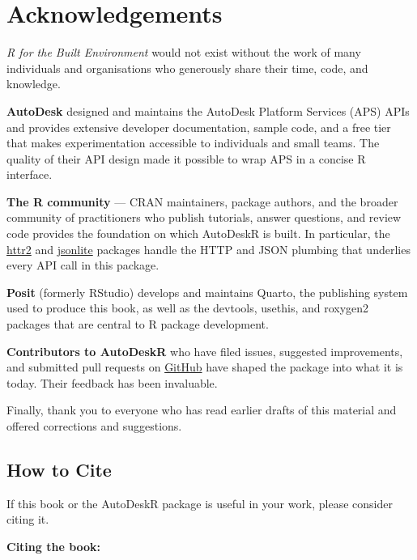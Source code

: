 \documentclass[
  11pt,
  letterpaper,
  DIV=11,
  numbers=noendperiod]{scrreprt}
\begin{document}
\chapter*{Acknowledgements}\label{acknowledgements}


\emph{R for the Built Environment} would not exist without the work of
many individuals and organisations who generously share their time,
code, and knowledge.

\textbf{AutoDesk} designed and maintains the AutoDesk Platform Services
(APS) APIs and provides extensive developer documentation, sample code,
and a free tier that makes experimentation accessible to individuals and
small teams. The quality of their API design made it possible to wrap
APS in a concise R interface.

\textbf{The R community} --- CRAN maintainers, package authors, and the
broader community of practitioners who publish tutorials, answer
questions, and review code provides the foundation on which AutoDeskR is
built. In particular, the \href{https://httr2.r-lib.org}{httr2} and
\href{https://jeroen.r-universe.dev/jsonlite}{jsonlite} packages handle
the HTTP and JSON plumbing that underlies every API call in this
package.

\textbf{Posit} (formerly RStudio) develops and maintains Quarto, the
publishing system used to produce this book, as well as the devtools,
usethis, and roxygen2 packages that are central to R package
development.

\textbf{Contributors to AutoDeskR} who have filed issues, suggested
improvements, and submitted pull requests on
\href{https://github.com/paulgovan/AutoDeskR}{GitHub} have shaped the
package into what it is today. Their feedback has been invaluable.

Finally, thank you to everyone who has read earlier drafts of this
material and offered corrections and suggestions.

\section*{How to Cite}\label{how-to-cite}


If this book or the AutoDeskR package is useful in your work, please
consider citing it.

\textbf{Citing the book:}
\end{document}
